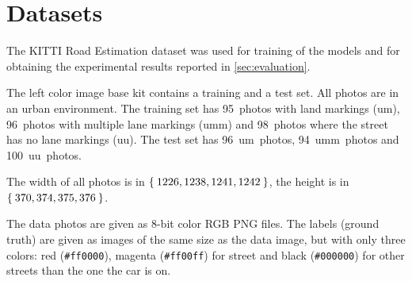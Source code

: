 
\section{Datasets}\label{sec:datasets}
The KITTI Road Estimation dataset \cite{Fritsch2013} was used for training of
the models and for obtaining the experimental results reported in
\cref{sec:evaluation}.

The left color image base kit contains a training and a test set. All photos
are in an urban environment. The training set has 95~photos with land markings
(um), 96~photos with multiple lane markings (umm) and 98~photos where the
street has no lane markings (uu). The test set has 96~um~photos, 94~umm~photos
and 100~uu~photos.

The width of all photos is in $\Set{1226, 1238, 1241, 1242}$, the height is in
$\Set{370, 374, 375, 376}$.

The data photos are given as 8-bit color RGB PNG files. The labels (ground
truth) are given as images of the same size as the data image, but with only
three colors: red (\verb+#ff0000+), magenta (\verb+#ff00ff+) for street and
black (\verb+#000000+) for other streets than the one the car is on.